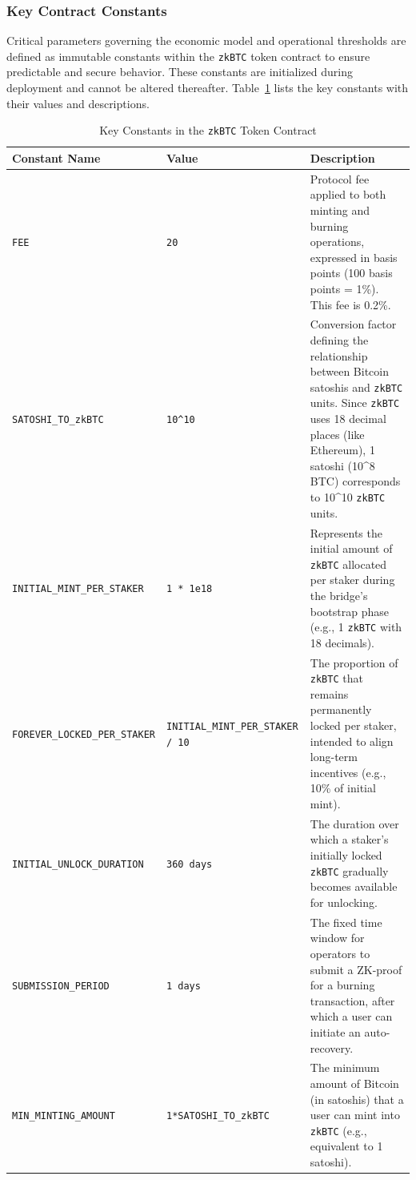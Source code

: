 \documentclass{DESSThesis}
\newcommand{\zktoken}{\texttt{zkBTC}}
\begin{document}
\subsubsection{Key Contract Constants}
Critical parameters governing the economic model and operational thresholds are defined as immutable constants within the \texttt{\zktoken} token contract to ensure predictable and secure behavior. These constants are initialized during deployment and cannot be altered thereafter. Table~\ref{tab:contract_constants} lists the key constants with their values and descriptions.

\begin{table}[htbp]
\label{tab:contract_constants}
\centering
\small
\begin{tabularx}{\textwidth}{|X|X|X|} %
\hline
\textbf{Constant Name} & \textbf{Value} & \textbf{Description} \\
\hline
\texttt{FEE} & \texttt{20} & Protocol fee applied to both minting and burning operations, expressed in basis points (100 basis points = 1\%). This fee is 0.2\%. \\
\hline
\texttt{SATOSHI\allowbreak\_TO\allowbreak\_\zktoken} & \texttt{10\textasciicircum{}10} & Conversion factor defining the relationship between Bitcoin satoshis and \texttt{\zktoken} units. Since \texttt{\zktoken} uses 18 decimal places (like Ethereum), 1 satoshi (10\textasciicircum{}8 BTC) corresponds to 10\textasciicircum{}10 \texttt{\zktoken} units. \\
\hline
\texttt{INITIAL\allowbreak\_MINT\allowbreak\_PER\allowbreak\_STAKER} & \texttt{1 * 1e18} & Represents the initial amount of \texttt{\zktoken} allocated per staker during the bridge's bootstrap phase (e.g., 1 \texttt{\zktoken} with 18 decimals). \\
\hline
\texttt{FOREVER\allowbreak\_LOCKED\allowbreak\_PER\allowbreak\_STAKER} & \texttt{INITIAL\allowbreak\_MINT\allowbreak\_PER\allowbreak\_STAKER\allowbreak{} / 10} & The proportion of \texttt{\zktoken} that remains permanently locked per staker, intended to align long-term incentives (e.g., 10\% of initial mint). \\
\hline
\texttt{INITIAL\allowbreak\_UNLOCK\allowbreak\_DURATION} & \texttt{360 days} & The duration over which a staker's initially locked \texttt{\zktoken} gradually becomes available for unlocking. \\
\hline
\texttt{SUBMISSION\allowbreak\_PERIOD} & \texttt{1 days} & The fixed time window for operators to submit a ZK-proof for a burning transaction, after which a user can initiate an auto-recovery. \\
\hline
\texttt{MIN\allowbreak\_MINTING\allowbreak\_AMOUNT} & \texttt{1*\allowbreak{}SATOSHI\allowbreak\_TO\allowbreak\_\zktoken} & The minimum amount of Bitcoin (in satoshis) that a user can mint into \texttt{\zktoken} (e.g., equivalent to 1 satoshi). \\
\hline
\end{tabularx}
\caption{Key Constants in the \texttt{\zktoken} Token Contract}
\end{table}
\end{document}
